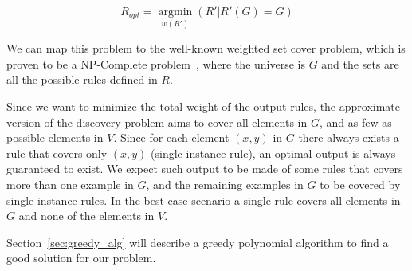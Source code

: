 $$R_{opt}=\underset{w(R')}{\operatorname{argmin}}(R'|R'(G) = G)$$


We can map this problem to the well-known weighted set cover problem, which is proven to be a NP-Complete problem~\cite{chvatal1979greedy}, where the universe is $G$ and the sets are all the possible rules defined in $R$.

Since we want to minimize the total weight of the output rules, the approximate version of the discovery problem aims to cover all elements in $G$, and as few as possible elements in $V$. Since for each element $(x,y)$ in $G$ there always exists a rule that covers only $(x,y)$ (single-instance rule), an optimal output is always guaranteed to exist. We expect such output to be made of some rules that covers more than one example in $G$, and the remaining examples in $G$ to be covered by single-instance rules. In the best-case scenario a single rule covers all elements in $G$ and none of the elements in $V$.

Section~\ref{sec:greedy_alg} will describe a greedy polynomial algorithm to find a good solution for our problem.



